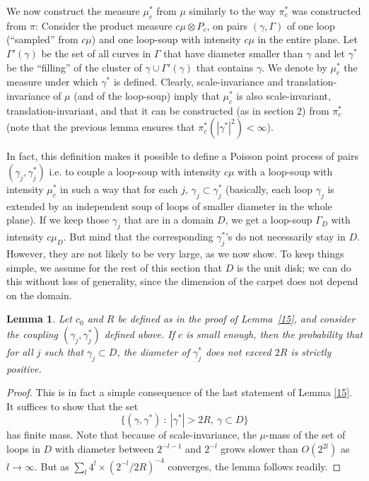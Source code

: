 \documentclass[11pt]{article}
\newtheorem {lemma} [Theorem]    {Lemma}
\begin{document}
We now construct the measure $\mu_c^*$ from $\mu$ similarly
to the way $\pi_c^*$ was constructed from $\pi$:
Consider the product measure $c \mu \otimes P_c$, on pairs $(\gamma, \Gamma)$
of one loop (``sampled'' from $c\mu$)
and one loop-soup with intensity $c \mu$ {in the entire plane}. 
Let $\Gamma' ( \gamma)$ be the set of all curves in $\Gamma$ that 
have diameter {smaller} than $\gamma$ and let 
$\gamma^*$ be the ``filling'' of the cluster of $\gamma \cup \Gamma'(\gamma)$ that contains $\gamma$. We denote by $\mu_c^*$ the measure under which 
$\gamma^*$ is defined. Clearly, scale-invariance and translation-invariance of $\mu$ (and of the loop-soup) imply that $\mu_c^*$ is also scale-invariant, translation-invariant, and that it can be constructed (as in section 2) from $\pi_c^*$ (note that the previous lemma ensures that $  \pi^*_c ( |\gamma^*|^2) < \infty$).

In fact, this definition makes it possible to define a Poisson point process of 
pairs $(\gamma_j, \gamma_j^*)$  i.e. to couple a loop-soup with intensity $c\mu$ with a loop-soup with intensity $\mu_c^*$ in such a way that for each $j$, $\gamma_j \subset \gamma_j^*$ (basically, each loop $\gamma_j$ is extended by an independent soup of loops of smaller diameter in the whole plane). 
If we keep those $\gamma_j$ that are in a domain $D$, 
we get a loop-soup $\Gamma_D$ with intensity $c\mu_D$. 
But mind that the corresponding $\gamma_j^*$'s do not necessarily stay in $D$. 
However, they are not likely to be very large, as we now show.
To keep things simple, we assume for the rest of this section that $D$ is
the unit disk; we can do this without loss of generality, since the dimension
of the carpet does not depend on the domain.

\begin {lemma}
Let $c_0$ and $R$ be defined as in the proof of Lemma~\ref{15}, 
and consider the coupling $(\gamma_j, \gamma_j^*)$ defined above.
If $c$ is small enough, then the probability that 
for all $j$ such that $\gamma_j \subset D$, the diameter of $\gamma_j^*$ does not exceed $2R$ 
is strictly positive.
\end {lemma}

\begin {proof}
This is in fact a simple consequence of the last statement of Lemma \ref {15}. It suffices to show that the set 
$$ \{ (\gamma, \gamma^*) \  : \  |\gamma^*| > 2R, \  \gamma \subset D \} $$
has finite mass. 
Note that because of scale-invariance,  the $\mu$-mass of the set of loops in $D$ with diameter between $2^{-l-1}$ and $2^{-l}$ grows 
slower than $O(2^{2l})$ as $l \to \infty$. 
But as $\sum_l 4^l \times (2^{-l}/ 2R)^{-4}$ converges, the lemma follows readily.  
\end {proof}
\end{document}
